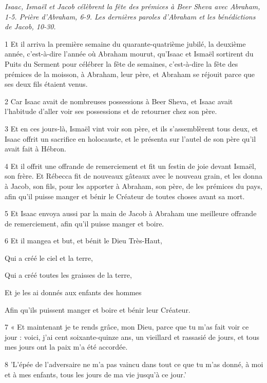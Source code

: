 \par \textit{Isaac, Ismaël et Jacob célèbrent la fête des prémices à Beer Sheva avec Abraham, 1-5. Prière d'Abraham, 6-9. Les dernières paroles d'Abraham et les bénédictions de Jacob, 10-30.}

\par 1 Et il arriva la première semaine du quarante-quatrième jubilé, la deuxième année, c'est-à-dire l'année où Abraham mourut, qu'Isaac et Ismaël sortirent du Puits du Serment pour célébrer la fête de semaines, c'est-à-dire la fête des prémices de la moisson, à Abraham, leur père, et Abraham se réjouit parce que ses deux fils étaient venus.
\par 2 Car Isaac avait de nombreuses possessions à Beer Sheva, et Isaac avait l'habitude d'aller voir ses possessions et de retourner chez son père.
\par 3 Et en ces jours-là, Ismaël vint voir son père, et ils s'assemblèrent tous deux, et Isaac offrit un sacrifice en holocauste, et le présenta sur l'autel de son père qu'il avait fait à Hébron.
\par 4 Et il offrit une offrande de remerciement et fit un festin de joie devant Ismaël, son frère. Et Rébecca fit de nouveaux gâteaux avec le nouveau grain, et les donna à Jacob, son fils, pour les apporter à Abraham, son père, de les prémices du pays, afin qu'il puisse manger et bénir le Créateur de toutes choses avant sa mort.
\par 5 Et Isaac envoya aussi par la main de Jacob à Abraham une meilleure offrande de remerciement, afin qu'il puisse manger et boire.
\par 6 Et il mangea et but, et bénit le Dieu Très-Haut,
\par    
\par     Qui a créé le ciel et la terre,  
\par     Qui a créé toutes les graisses de la terre,  
\par     Et je les ai donnés aux enfants des hommes  
\par     Afin qu'ils puissent manger et boire et bénir leur Créateur.
\par    
\par 7 « Et maintenant je te rends grâce, mon Dieu, parce que tu m'as fait voir ce jour : voici, j'ai cent soixante-quinze ans, un vieillard et rassasié de jours, et tous mes jours ont la paix m'a été accordée.
\par 8 'L'épée de l'adversaire ne m'a pas vaincu dans tout ce que tu m'as donné, à moi et à mes enfants, tous les jours de ma vie jusqu'à ce jour.'
